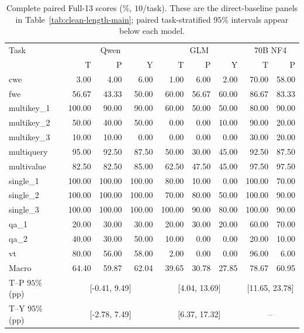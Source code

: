 \begin{table}[ht]
\centering\small
\caption{Complete paired Full-13 scores (\%, $10$/task). These are the direct-baseline panels in Table~\ref{tab:clean-length-main}; paired task-stratified $95\%$ intervals appear below each model.}
\label{tab:full13-tasks-qg}
\begin{tabular}{@{}lrrrrrrrr@{}}
\toprule
Task & \multicolumn{3}{c}{Qwen} & \multicolumn{3}{c}{GLM} & \multicolumn{2}{c}{70B NF4} \\
 & T & P & Y & T & P & Y & T & P \\
\midrule
cwe & 3.00 & 4.00 & 6.00 & 1.00 & 6.00 & 2.00 & 70.00 & 58.00 \\
fwe & 56.67 & 43.33 & 50.00 & 60.00 & 56.67 & 60.00 & 86.67 & 83.33 \\
multikey\_1 & 100.00 & 90.00 & 90.00 & 60.00 & 50.00 & 50.00 & 80.00 & 90.00 \\
multikey\_2 & 50.00 & 40.00 & 50.00 & 0.00 & 0.00 & 10.00 & 90.00 & 20.00 \\
multikey\_3 & 10.00 & 10.00 & 0.00 & 0.00 & 0.00 & 0.00 & 30.00 & 20.00 \\
multiquery & 95.00 & 92.50 & 87.50 & 50.00 & 30.00 & 45.00 & 92.50 & 87.50 \\
multivalue & 82.50 & 82.50 & 85.00 & 62.50 & 47.50 & 45.00 & 97.50 & 97.50 \\
single\_1 & 100.00 & 100.00 & 100.00 & 80.00 & 10.00 & 0.00 & 100.00 & 70.00 \\
single\_2 & 100.00 & 100.00 & 100.00 & 70.00 & 80.00 & 50.00 & 100.00 & 90.00 \\
single\_3 & 100.00 & 100.00 & 100.00 & 100.00 & 90.00 & 80.00 & 100.00 & 90.00 \\
qa\_1 & 20.00 & 30.00 & 30.00 & 20.00 & 30.00 & 20.00 & 60.00 & 70.00 \\
qa\_2 & 40.00 & 30.00 & 50.00 & 10.00 & 0.00 & 0.00 & 20.00 & 10.00 \\
vt & 80.00 & 56.00 & 58.00 & 2.00 & 0.00 & 0.00 & 96.00 & 6.00 \\
\midrule
Macro & 64.40 & 59.87 & 62.04 & 39.65 & 30.78 & 27.85 & 78.67 & 60.95 \\
T--P $95\%$ (pp) & \multicolumn{3}{c}{[-0.41, 9.49]} & \multicolumn{3}{c}{[4.04, 13.69]} & \multicolumn{2}{c}{[11.65, 23.78]} \\
T--Y $95\%$ (pp) & \multicolumn{3}{c}{[-2.78, 7.49]} & \multicolumn{3}{c}{[6.37, 17.32]} & \multicolumn{2}{c}{--} \\
\bottomrule
\end{tabular}
\end{table}
